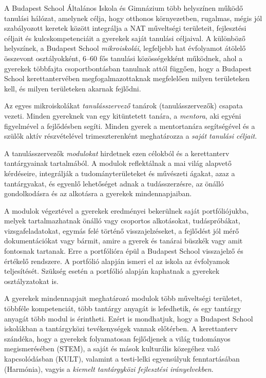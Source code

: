 A Budapest School Általános Iskola és Gimnázium több helyszínen működő tanulási hálózat, amelynek célja, hogy otthonos környezetben, rugalmas, mégis jól szabályozott keretek között integrálja a NAT műveltségi területeit, fejlesztési céljait és kulcskompetenciáit a gyerekek saját tanulási céljaival. A különböző helyszínek, a Budapest School \emph{mikroiskolái}, legfeljebb hat évfolyamot átölelő összevont osztályokként, 6--60 fős tanulási közösségekként működnek, ahol a gyerekek többfajta csoportbontásban tanulnak attól függően, hogy a Budapest School kerettantervében megfogalmazottaknak megfelelően milyen területeken kell, és milyen területeken akarnak fejlődni.

Az egyes mikroiskolákat \emph{tanulásszervező} tanárok (tanulásszervezők) csapata vezeti. Minden gyereknek van egy kitüntetett tanára, a \emph{mentora}, aki egyéni figyelmével a fejlődésben segíti. Minden gyerek a mentortanára segítségével és a szülők aktív részvételével trimeszterenként meghatározza a \emph{saját tanulási céljait}.

A tanulásszervezők \emph{modulokat} hirdetnek ezen célokból és a kerettanterv tantárgyainak tartalmából. A modulok reflektálnak a mai világ alapvető kérdéseire, integrálják	a tudományterületeket és mű\-vé\-sze\-ti á\-ga\-kat, azaz a tantárgyakat, és egyenlő lehetőséget adnak a tudásszerzésre, az önálló gondolkodásra és az alkotásra a gyerekek mindennapjaiban.

A modulok végeztével a gyerekek eredményei bekerülnek saját portfóliójukba, melyek tartalmazhatnak önálló vagy csoportos alkotásokat, tudáspróbákat, vizsgafeladatokat, egymás felé történő visszajelzéseket, a fejlődést jól mérő dokumentációkat vagy bármit, amire a gyerek és tanárai büszkék vagy amit fontosnak tartanak. Erre a portfólióra épül a Budapest School visszajelző és értékelő rendszere. A portfólió alapján ismeri el az iskola az évfolyamok teljesítését. Szükség esetén a portfólió alapján kaphatnak a gyerekek osztályzatokat is.

A gyerekek mindennapjait meghatározó modulok több műveltségi területet, többféle kompetenciát, több tantárgy anyagát is lefedhetik, és egy tantárgy anyagát több modul is érintheti.
Ezért is mondhatjuk, hogy a Budapest School iskolákban a tantárgyközi tevékenységek vannak előtérben. 
A kerettanterv szándéka, hogy a gyerekek folyamatosan fejlődjenek a világ tudományos megismerésében (STEM), a saját és mások kulturális közegéhez való kapcsolódásban (KULT), valamint a testi-lelki egyensúlyuk fenntartásában (Harmónia), vagyis a \emph{kiemelt tantárgyközi fejlesztési irányelvekben}. 

